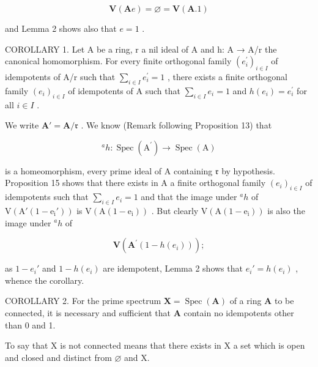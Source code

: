 \[
\mathbf {V} (\mathbf {A} e) = \varnothing = \mathbf {V} (\mathbf {A}. 1)
\]

and Lemma 2 shows also that \(e = 1\) .

COROLLARY 1. Let A be a ring, r a nil ideal of A and h: A → A/r the canonical homomorphism. For every finite orthogonal family \((e_{i}^{\prime})_{i\in I}\) of idempotents of A/r such that \(\sum_{i\in I} e_{i}^{\prime}=1\) , there exists a finite orthogonal family \((e_{i})_{i\in I}\) of idempotents of A such that \(\sum_{i\in I} e_{i}=1\) and \(h(e_{i})=e_{i}^{\prime}\) for all \(i\in I\) .

We write \(\mathbf{A}' = \mathbf{A} / \mathfrak{r}\) . We know (Remark following Proposition 13) that

\[
^ {a} h \colon \operatorname{Spec} (\mathrm{A} ^ {\prime}) \rightarrow \operatorname{Spec} (\mathrm{A})
\]

is a homeomorphism, every prime ideal of A containing \(\mathfrak{r}\) by hypothesis. Proposition 15 shows that there exists in A a finite orthogonal family \((e_i)_{i\in I}\) of idempotents such that \(\sum_{i\in I}e_i = 1\) and that the image under \(^ah\) of \(\mathrm{V(A'(1 - e_i'))}\) is \(\mathrm{V(A(1 - e_i))}\) . But clearly \(\mathrm{V(A(1 - e_i))}\) is also the image under \(^ah\) of

\[
\mathbf {V} (\mathbf {A} ^ {\prime} (1 - h (e _ {i})))  ;
\]

as \(1 - e_i'\) and \(1 - h(e_i)\) are idempotent, Lemma 2 shows that \(e_i' = h(e_i)\) , whence the corollary.

COROLLARY 2. For the prime spectrum \(\mathbf{X} = \operatorname{Spec}(\mathbf{A})\) of a ring \(\mathbf{A}\) to be connected, it is necessary and sufficient that \(\mathbf{A}\) contain no idempotents other than 0 and 1.

To say that X is not connected means that there exists in X a set which is open and closed and distinct from \(\varnothing\) and X.

